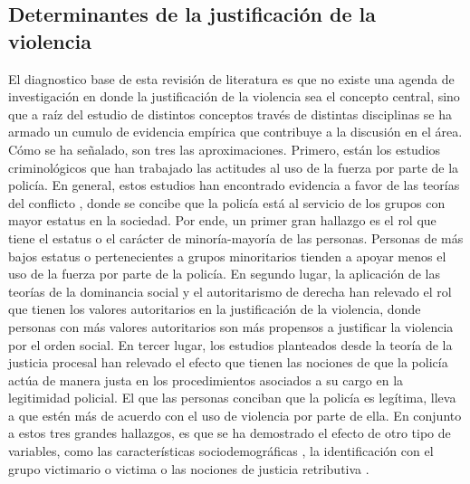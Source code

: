 \documentclass[12pt,twoside]{templates/facsothesis}
\begin{document}
\hypertarget{determinantes-de-la-justificaciuxf3n-de-la-violencia}{%
\subsection{Determinantes de la justificación de la violencia}\label{determinantes-de-la-justificaciuxf3n-de-la-violencia}}

El diagnostico base de esta revisión de literatura es que no existe una agenda de investigación en donde la justificación de la violencia sea el concepto central, sino que a raíz del estudio de distintos conceptos través de distintas disciplinas se ha armado un cumulo de evidencia empírica que contribuye a la discusión en el área. Cómo se ha señalado, son tres las aproximaciones. Primero, están los estudios criminológicos que han trabajado las actitudes al uso de la fuerza por parte de la policía. En general, estos estudios han encontrado evidencia a favor de las teorías del conflicto \citep{Chambliss1995, Quinney1971, Turk1969}, donde se concibe que la policía está al servicio de los grupos con mayor estatus en la sociedad. Por ende, un primer gran hallazgo es el rol que tiene el estatus o el carácter de minoría-mayoría de las personas. Personas de más bajos estatus o pertenecientes a grupos minoritarios tienden a apoyar menos el uso de la fuerza por parte de la policía. En segundo lugar, la aplicación de las teorías de la dominancia social \citep{Sidanius1999} y el autoritarismo de derecha \citep{Altemeyer1988} han relevado el rol que tienen los valores autoritarios en la justificación de la violencia, donde personas con más valores autoritarios son más propensos a justificar la violencia por el orden social. En tercer lugar, los estudios planteados desde la teoría de la justicia procesal \citep{Tyler2006} han relevado el efecto que tienen las nociones de que la policía actúa de manera justa en los procedimientos asociados a su cargo en la legitimidad policial. El que las personas conciban que la policía es legítima, lleva a que estén más de acuerdo con el uso de violencia por parte de ella. En conjunto a estos tres grandes hallazgos, es que se ha demostrado el efecto de otro tipo de variables, como las características sociodemográficas \citep{Gamson1970, Blumenthal1972, Arthur1994, Thompson2004, Gerber2017}, la identificación con el grupo victimario o victima \citep{Bradford2017, Gerber2017a} o las nociones de justicia retributiva \citep{Blumenthal1972, Puga2016}.
\end{document}
